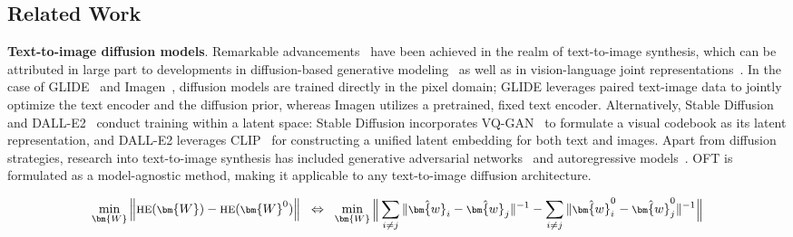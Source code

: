 \begin{itemize}[leftmargin=*,nosep]
\section{Related Work}

\textbf{Text-to-image diffusion models}. Remarkable advancements~\cite{saharia2022photorealistic,ramesh2022hierarchical,rombach2022high,gu2022vector,nichol2022glide} have been achieved in the realm of text-to-image synthesis, which can be attributed in large part to developments in diffusion-based generative modeling~\cite{ho2020denoising,song2021score,song2021denoising,dhariwal2021diffusion} as well as in vision-language joint representations~\cite{su2020vlbert,lu2019vilbert,radford2021learning,wang2021simvlm,li2022blip,li2023blip,alayrac2022flamingo,schuhmann2022laion}. In the case of GLIDE~\cite{nichol2022glide} and Imagen~\cite{saharia2022photorealistic}, diffusion models are trained directly in the pixel domain; GLIDE leverages paired text-image data to jointly optimize the text encoder and the diffusion prior, whereas Imagen utilizes a pretrained, fixed text encoder. Alternatively, Stable Diffusion~\cite{rombach2022high} and DALL-E2~\cite{ramesh2022hierarchical} conduct training within a latent space: Stable Diffusion incorporates VQ-GAN~\cite{esser2021taming} to formulate a visual codebook as its latent representation, and DALL-E2 leverages CLIP~\cite{radford2021learning} for constructing a unified latent embedding for both text and images. Apart from diffusion strategies, research into text-to-image synthesis has included generative adversarial networks~\cite{reed2016generative,zhang2017stackgan,xu2018attngan,li2019controllable} and autoregressive models~\cite{ramesh2021zero,ding2021cogview,wu2022nuwa,yuscaling}. OFT is formulated as a model-agnostic method, making it applicable to any text-to-image diffusion architecture.

\begin{equation}\label{eq:oft_principle}
\footnotesize
\min_{\bm{W}} \left\| \text{HE}(\bm{W})-\text{HE}(\bm{W}^0)\right\|~~\Leftrightarrow~~\min_{\bm{W}} \bigg{\|} \sum_{i\neq j} \|\hat{\bm{w}}_i-\hat{\bm{w}}_j\|^{-1}-\sum_{i\neq j} \|\hat{\bm{w}}^0_i-\hat{\bm{w}}^0_j\|^{-1}\bigg{\|}
\end{equation}


\end{itemize}
